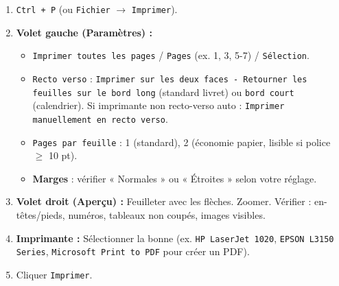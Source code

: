 \documentclass[11pt]{article}
\begin{document}
\begin{methode}
    \begin{enumerate}
        \item \texttt{Ctrl + P} (ou \texttt{Fichier} $\rightarrow$ \texttt{Imprimer}).
        \item \textbf{Volet gauche (Paramètres) :}
            \begin{itemize}
                \item \texttt{Imprimer toutes les pages} / \texttt{Pages} (ex. 1, 3, 5-7) / \texttt{Sélection}.
                \item \texttt{Recto verso} : \texttt{Imprimer sur les deux faces - Retourner les feuilles sur le bord long} (standard livret) ou \texttt{bord court} (calendrier). Si imprimante non recto-verso auto : \texttt{Imprimer manuellement en recto verso}.
                \item \texttt{Pages par feuille} : 1 (standard), 2 (économie papier, lisible si police $\ge$ 10 pt).
                \item \textbf{Marges} : vérifier « Normales » ou « Étroites » selon votre réglage.
            \end{itemize}
        \item \textbf{Volet droit (Aperçu) :} Feuilleter avec les flèches. Zoomer. Vérifier : en-têtes/pieds, numéros, tableaux non coupés, images visibles.
        \item \textbf{Imprimante :} Sélectionner la bonne (ex. \texttt{HP LaserJet 1020}, \texttt{EPSON L3150 Series}, \texttt{Microsoft Print to PDF} pour créer un PDF).
        \item Cliquer \texttt{Imprimer}.
    \end{enumerate}
\end{methode}
\end{document}
